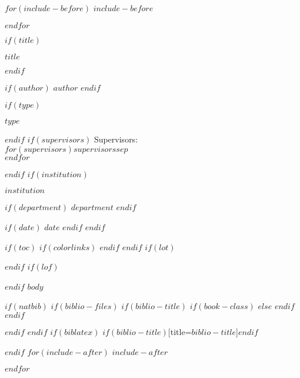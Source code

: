 \documentclass[
pagelayout=standardaureo,%
smallcapsstyle=upper,
12pt]{suftesi}
\begin{document}
$for(include-before)$
$include-before$

$endfor$
\begin{titlepage}
    \begin{center}
        
        \vspace*{2.5cm}

        $if(title)$
        
        \huge
        $title$
	 
        \vspace{1.5cm}

        $endif$         
        
        $if(author)$
        \Large $author$
        $endif$ 

        $if(type)$
        \vspace{1.5cm}

        \normalsize
        $type$
        
        \vfill
        $endif$   
       $if(supervisors)$
        \normalsize
        Supervisors:\\
        $for(supervisors)$$supervisors$$sep$\\$endfor$
		
        \vspace{0.8cm}
        $endif$   
        $if(institution)$
        
        \normalsize
        $institution$

        $if(department)$
        $department$
        $endif$

        $if(date)$
        $date$
        $endif$ 
        $endif$   
    \end{center}
\end{titlepage}


$if(toc)$
{
$if(colorlinks)$
\hypersetup{linkcolor=$if(toccolor)$$toccolor$$else$black$endif$}
$endif$
\setcounter{tocdepth}{$toc-depth$}
\tableofcontents
}
$endif$
$if(lot)$
\listoftables
$endif$
$if(lof)$
\listoffigures
$endif$
$body$

$if(natbib)$
$if(biblio-files)$
$if(biblio-title)$
$if(book-class)$
\renewcommand\bibname{$biblio-title$}
$else$
\renewcommand\refname{$biblio-title$}
$endif$
$endif$


$endif$
$endif$
$if(biblatex)$
\printbibliography$if(biblio-title)$[title=$biblio-title$]$endif$

$endif$
$for(include-after)$
$include-after$

$endfor$
\end{document}
